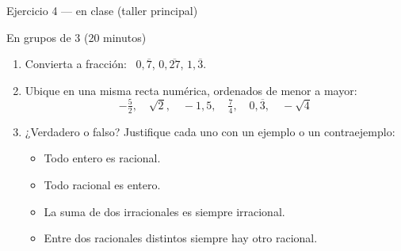 \documentclass[aspectratio=169,10pt]{beamer}
\begin{document}
\begin{frame}{Ejercicio 4 — en clase (taller principal)}
  \begin{alertblock}{En grupos de 3 (20 minutos)}
    \scriptsize
    \begin{enumerate}\setlength{\itemsep}{0.02cm}
      \item Convierta a fracción: \ $0{,}\overline{7}$, \quad
            $0{,}\overline{27}$, \quad $1{,}\overline{3}$.
      \item Ubique en una misma recta numérica, ordenados de menor a mayor:
            \[ -\tfrac{5}{2}, \quad \sqrt{2}, \quad -1{,}5, \quad
               \tfrac{7}{4}, \quad 0{,}\overline{3}, \quad -\sqrt{4} \]
      \item ¿Verdadero o falso? Justifique cada uno con un ejemplo o un
            contraejemplo:
            \begin{itemize}\setlength{\itemsep}{-0.04cm}
              \item[a)] Todo entero es racional.
              \item[b)] Todo racional es entero.
              \item[c)] La suma de dos irracionales es siempre irracional.
              \item[d)] Entre dos racionales distintos siempre hay otro
                        racional.
            \end{itemize}
    \end{enumerate}
  \end{alertblock}
\end{frame}
\end{document}
